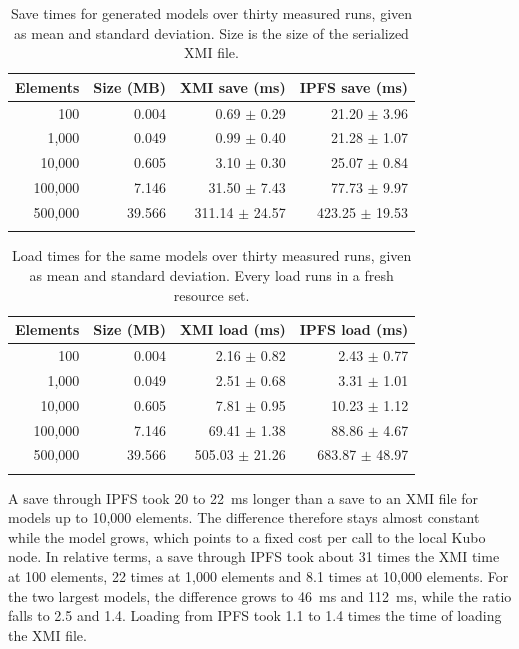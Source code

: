 \documentclass[iicol,pdflatex,sn-mathphys-num]{sn-jnl}
\theoremstyle{thmstylethree}%
\begin{document}
\begin{table}[t]
\caption{Save times for generated models over thirty measured runs, given as mean and standard deviation. Size is the size of the serialized XMI file.}\label{tab:rq3-save}
\fontsize{8bp}{9.5bp}\selectfont
\setlength{\tabcolsep}{3pt}
\begin{tabular}{@{}rrrr@{}}
\toprule
Elements & Size (MB) & XMI save (ms) & IPFS save (ms) \\
\midrule
100 & 0.004 & 0.69 $\pm$ 0.29 & 21.20 $\pm$ 3.96 \\
1,000 & 0.049 & 0.99 $\pm$ 0.40 & 21.28 $\pm$ 1.07 \\
10,000 & 0.605 & 3.10 $\pm$ 0.30 & 25.07 $\pm$ 0.84 \\
100,000 & 7.146 & 31.50 $\pm$ 7.43 & 77.73 $\pm$ 9.97 \\
500,000 & 39.566 & 311.14 $\pm$ 24.57 & 423.25 $\pm$ 19.53 \\
\botrule
\end{tabular}
\end{table}

\begin{table}[t]
\caption{Load times for the same models over thirty measured runs, given as mean and standard deviation. Every load runs in a fresh resource set.}\label{tab:rq3-load}
\fontsize{8bp}{9.5bp}\selectfont
\setlength{\tabcolsep}{3pt}
\begin{tabular}{@{}rrrr@{}}
\toprule
Elements & Size (MB) & XMI load (ms) & IPFS load (ms) \\
\midrule
100 & 0.004 & 2.16 $\pm$ 0.82 & 2.43 $\pm$ 0.77 \\
1,000 & 0.049 & 2.51 $\pm$ 0.68 & 3.31 $\pm$ 1.01 \\
10,000 & 0.605 & 7.81 $\pm$ 0.95 & 10.23 $\pm$ 1.12 \\
100,000 & 7.146 & 69.41 $\pm$ 1.38 & 88.86 $\pm$ 4.67 \\
500,000 & 39.566 & 505.03 $\pm$ 21.26 & 683.87 $\pm$ 48.97 \\
\botrule
\end{tabular}
\end{table}

A save through IPFS took 20 to 22~ms longer than a save to an XMI file for models up to 10,000 elements. The difference therefore stays almost constant while the model grows, which points to a fixed cost per call to the local Kubo node. In relative terms, a save through IPFS took about 31 times the XMI time at 100 elements, 22 times at 1,000 elements and 8.1 times at 10,000 elements. For the two largest models, the difference grows to 46~ms and 112~ms, while the ratio falls to 2.5 and 1.4. Loading from IPFS took 1.1 to 1.4 times the time of loading the XMI file.
\end{document}
